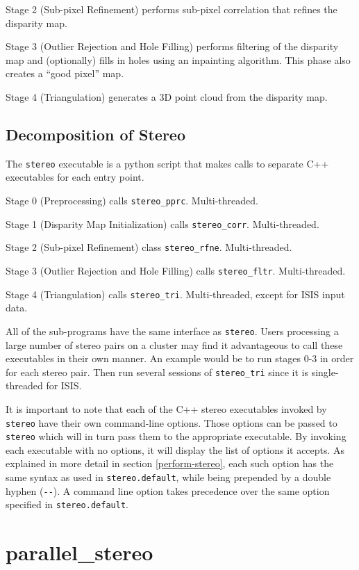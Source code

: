 Stage 2 (Sub-pixel Refinement) performs sub-pixel correlation that
refines the disparity map.

Stage 3 (Outlier Rejection and Hole Filling) performs filtering of the
disparity map and (optionally) fills in holes using an inpainting
algorithm.  This phase also creates a ``good pixel'' map.

Stage 4 (Triangulation) generates a 3D point cloud from the disparity
map.

\subsection{Decomposition of Stereo}
\label{stereo_dec}

The \texttt{stereo}
executable is a python script that makes calls to separate
C++ executables for each entry point.

Stage 0 (Preprocessing) calls \texttt{stereo\_pprc}. Multi-threaded.

Stage 1 (Disparity Map Initialization) calls
\texttt{stereo\_corr}. Multi-threaded.

Stage 2 (Sub-pixel Refinement) class \texttt{stereo\_rfne}. Multi-threaded.

Stage 3 (Outlier Rejection and Hole Filling) calls
\texttt{stereo\_fltr}. Multi-threaded.

Stage 4 (Triangulation) calls \texttt{stereo\_tri}. Multi-threaded,
except for ISIS input data.

All of the sub-programs have the same interface as
\texttt{stereo}. Users processing a large number of stereo pairs on a
cluster may find it advantageous to call these executables in their own
manner. An example would be to run stages 0-3 in order for each stereo
pair. Then run several sessions of \texttt{stereo\_tri} since it is
single-threaded for ISIS.

It is important to note that each of the C++ stereo executables invoked
by \texttt{stereo} have their own command-line options. Those options
can be passed to \texttt{stereo} which will in turn pass them to the
appropriate executable. By invoking each executable with no options, it
will display the list of options it accepts. As explained in more detail
in section \ref{perform-stereo}, each such option has the same syntax as
used in \texttt{stereo.default}, while being prepended by a double hyphen
(\texttt{-\/-}).  A command line option takes precedence over the same
option specified in \texttt{stereo.default}.

\section{parallel\_stereo}
\label{parallel}

